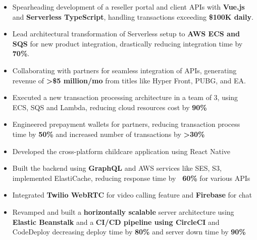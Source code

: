\documentclass[10pt,a4paper,ragged2e,withhyper]{altacv}
\begin{document}
\begin{paracol}{2}




\begin{itemize}
\item Spearheading development of a reseller portal and client APIs with {\bf Vue.js} and {\bf Serverless TypeScript}, handling transactions exceeding {\bf \$100K daily}.
\item Lead architectural transformation of Serverless setup to {\bf AWS ECS and SQS} for new product integration, drastically reducing integration time by {\bf 70\%}.
\item Collaborating with partners for seamless integration of APIs, generating \hspace{1cm} revenue of {\bf >\$5 million/mo} from titles like Hyper Front, PUBG, and EA.
\item Executed a new transaction processing architecture in a team of 3, using ECS, SQS and Lambda, reducing cloud resources cost by {\bf 90\%}
\item Engineered prepayment wallets for partners, reducing transaction process time by {\bf 50\%} and increased number of transactions by {\bf >30\%}
\end{itemize}

\divider\smallskip


\begin{itemize}
\item Developed the cross-platform childcare application using React Native
\item Built the backend using {\bf GraphQL} and AWS services like SES, S3, implemented ElastiCache, reducing response time by {\bf ~60\%} for various APIs
\item Integrated {\bf Twilio WebRTC} for video calling feature and {\bf Firebase} for chat
\item Revamped and built a {\bf horizontally scalable} server architecture using {\bf Elastic Beanstalk} and a {\bf CI/CD pipeline using CircleCI} and CodeDeploy decreasing deploy time by {\bf 80\%} and server down time by {\bf 90\%} 
\end{itemize}


\end{paracol}
\end{document}
